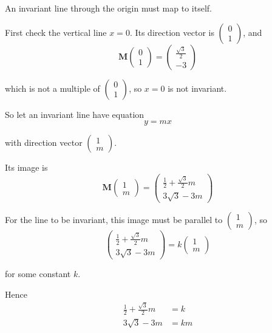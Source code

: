 \documentclass[leqno]{article}
\begin{document}
\begin{enumerate}[
  label=\textbf{\arabic*.},
  leftmargin=*,
  topsep=0pt,
  partopsep=0pt,
  parsep=0pt
]
\begin{djsSolution}
\begin{enumerate}[label=\textbf{(\alph*)}]
An invariant line through the origin must map to itself.

First check the vertical line \(x=0\). Its direction vector is \(\begin{pmatrix}0\\1\end{pmatrix}\), and
\[
\mathbf{M}\begin{pmatrix}0\\1\end{pmatrix}
=
\begin{pmatrix}\frac{\sqrt3}{2}\\-3\end{pmatrix}
\]

which is not a multiple of \(\begin{pmatrix}0\\1\end{pmatrix}\), so \(x=0\) is not invariant.

So let an invariant line have equation
\[
y=mx
\]

with direction vector \(\begin{pmatrix}1\\m\end{pmatrix}\).

Its image is
\[
\mathbf{M}\begin{pmatrix}1\\m\end{pmatrix}
=
\begin{pmatrix}
\frac12+\frac{\sqrt3}{2}m\\[4pt]
3\sqrt3-3m
\end{pmatrix}
\]

For the line to be invariant, this image must be parallel to \(\begin{pmatrix}1\\m\end{pmatrix}\), so
\[
\begin{pmatrix}
\frac12+\frac{\sqrt3}{2}m\\[4pt]
3\sqrt3-3m
\end{pmatrix}
=
k\begin{pmatrix}1\\m\end{pmatrix}
\]

for some constant \(k\).

Hence
\begin{align*}
\frac12+\frac{\sqrt3}{2}m &= k \\
3\sqrt3-3m &= km
\end{align*}


\end{enumerate}
\end{djsSolution}
\end{enumerate}
\end{document}
